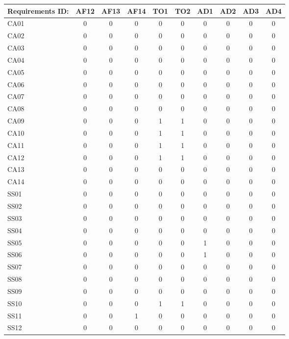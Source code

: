 \documentclass [10pt]{article}
\begin{document}
\begin{longtable}{ | p{} | c | c | c | c | c | c | c | c | c | }
\hline
	Requirements ID: & AF12 & AF13 & AF14 & TO1 & TO2 & AD1 & AD2 & AD3 & AD4 \\ \hline
	CA01 & 0 & 0 & 0 & 0 & 0 & 0 & 0 & 0 & 0 \\ \hline
	CA02 & 0 & 0 & 0 & 0 & 0 & 0 & 0 & 0 & 0 \\ \hline
	CA03 & 0 & 0 & 0 & 0 & 0 & 0 & 0 & 0 & 0 \\ \hline
	CA04 & 0 & 0 & 0 & 0 & 0 & 0 & 0 & 0 & 0 \\ \hline
	CA05 & 0 & 0 & 0 & 0 & 0 & 0 & 0 & 0 & 0 \\ \hline
	CA06 & 0 & 0 & 0 & 0 & 0 & 0 & 0 & 0 & 0 \\ \hline
	CA07 & 0 & 0 & 0 & 0 & 0 & 0 & 0 & 0 & 0 \\ \hline
	CA08 & 0 & 0 & 0 & 0 & 0 & 0 & 0 & 0 & 0 \\ \hline
	CA09 & 0 & 0 & 0 & 1 & 1 & 0 & 0 & 0 & 0 \\ \hline
	CA10 & 0 & 0 & 0 & 1 & 1 & 0 & 0 & 0 & 0 \\ \hline
	CA11 & 0 & 0 & 0 & 1 & 1 & 0 & 0 & 0 & 0 \\ \hline
	CA12 & 0 & 0 & 0 & 1 & 1 & 0 & 0 & 0 & 0 \\ \hline
	CA13 & 0 & 0 & 0 & 0 & 0 & 0 & 0 & 0 & 0 \\ \hline
	CA14 & 0 & 0 & 0 & 0 & 0 & 0 & 0 & 0 & 0 \\ \hline
	SS01 & 0 & 0 & 0 & 0 & 0 & 0 & 0 & 0 & 0 \\ \hline
	SS02 & 0 & 0 & 0 & 0 & 0 & 0 & 0 & 0 & 0 \\ \hline
	SS03 & 0 & 0 & 0 & 0 & 0 & 0 & 0 & 0 & 0 \\ \hline
	SS04 & 0 & 0 & 0 & 0 & 0 & 0 & 0 & 0 & 0 \\ \hline
	SS05 & 0 & 0 & 0 & 0 & 0 & 1 & 0 & 0 & 0 \\ \hline
	SS06 & 0 & 0 & 0 & 0 & 0 & 1 & 0 & 0 & 0 \\ \hline
	SS07 & 0 & 0 & 0 & 0 & 0 & 0 & 0 & 0 & 0 \\ \hline
	SS08 & 0 & 0 & 0 & 0 & 0 & 0 & 0 & 0 & 0 \\ \hline
	SS09 & 0 & 0 & 0 & 0 & 0 & 0 & 0 & 0 & 0 \\ \hline
	SS10 & 0 & 0 & 0 & 1 & 1 & 0 & 0 & 0 & 0 \\ \hline
	SS11 & 0 & 0 & 1 & 0 & 0 & 0 & 0 & 0 & 0 \\ \hline
	SS12 & 0 & 0 & 0 & 0 & 0 & 0 & 0 & 0 & 0 \\ \hline

\end{longtable}
\end{document}
